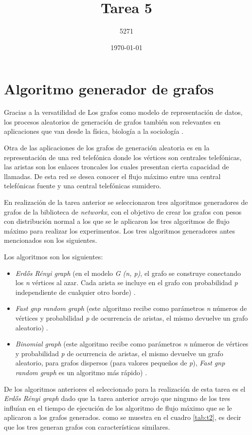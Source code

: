 \documentclass{article}
\title{Tarea 5}
\author{5271}
\date{\today}
\begin{document}
\maketitle

\section{Algoritmo generador de grafos}

Gracias a la versatilidad de Los grafos como modelo de representación de datos, los procesos aleatorios de generación de grafos también son relevantes en aplicaciones que van desde la física, biología a la sociología \cite{Nobari}.

Otra de las aplicaciones de los grafos de generación aleatoria es en la representación de una red telefónica donde los vértices son centrales telefónicas, las aristas son los enlaces troncales los cuales presentan cierta capacidad de llamadas. De esta red se desea conocer el flujo máximo entre una central telefónicas fuente y una central telefónicas sumidero.

En realización de la tarea anterior se seleccionaron tres algoritmos generadores de grafos de la biblioteca de \textit{networkx}, con el objetivo de crear los grafos con pesos con distribución normal a los que se le aplicaron los tres algoritmos de flujo máximo para realizar los experimentos. Los tres algoritmos generadores antes mencionados son los siguientes.		
 
Los algoritmos son los siguientes:

\begin{itemize}
  \item\textit{Erdős Rényi graph} (en el modelo \textit {G (n, p)}, el grafo se construye conectando los \textit{n} vértices al azar. Cada arista se incluye en el grafo con probabilidad \textit{p} independiente de cualquier otro borde)  \cite{erg}.  
   \item\textit{Fast gnp random graph} (este algoritmo recibe como parámetros \textit{n} números de vértices y probabilidad \textit{p} de ocurrencia de aristas, el mismo devuelve un grafo aleatorio) \cite{rgf}.
	\item\textit{Binomial graph} (este algoritmo recibe como parámetros \textit{n} números de vértices y probabilidad \textit{p} de ocurrencia de aristas, el mismo devuelve un grafo aleatorio, para grafos dispersos (para valores pequeños de \textit{p}), \textit{Fast gnp random graph} es un algoritmo más rápido) \cite{bg}.
\end{itemize}
De los algoritmos anteriores el seleccionado para la realización de esta tarea es el \textit{Erdős Rényi graph} dado que la tarea anterior arrojo que ninguno de los tres influían en el tiempo de ejecución de los algoritmo de flujo máximo que se le aplicaron a los grafos generados. como se muestra en el cuadro \ref{tab:t2}, es decir que los tres generan grafos con características similares.
\end{document}
